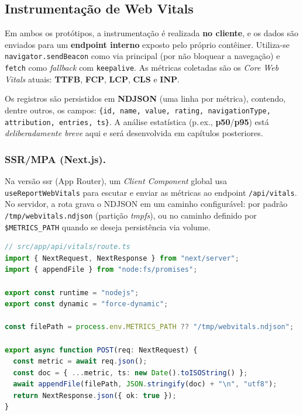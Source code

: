 \subsection{Instrumentação de Web Vitals}
\label{ssec:instrumentacao-webvitals}

Em ambos os protótipos, a instrumentação é realizada \textbf{no cliente}, e os dados são enviados para um \textbf{endpoint interno} exposto pelo próprio contêiner. Utiliza-se \texttt{navigator.sendBeacon} como via principal (por não bloquear a navegação) e \texttt{fetch} como \textit{fallback} com \texttt{keepalive}. As métricas coletadas são os \textit{Core Web Vitals} atuais: \textbf{TTFB}, \textbf{FCP}, \textbf{LCP}, \textbf{CLS} e \textbf{INP}. 

Os registros são persistidos em \textbf{NDJSON} (uma linha por métrica), contendo, dentre outros, os campos:
\texttt{\{id, name, value, rating, navigationType, attribution, entries, ts\}}. A análise estatística (p.\,ex., \textbf{p50}/\textbf{p95}) está \textit{deliberadamente breve} aqui e será desenvolvida em capítulos posteriores.

\subsubsection{SSR/MPA (Next.js).}
Na versão \acrshort{ssr} (App Router), um \textit{Client Component} global usa \texttt{useReportWebVitals} para escutar e enviar as métricas ao endpoint \texttt{/api/vitals}. No servidor, a rota grava o NDJSON em um caminho configurável: por padrão \texttt{/tmp/webvitals.ndjson} (partição \textit{tmpfs}), ou no caminho definido por \texttt{\$METRICS\_PATH} quando se deseja persistência via volume.

\begin{lstlisting}[language=TypeScript,caption={Endpoint de métricas no SSR/Next.js (visão de servidor)}]
// src/app/api/vitals/route.ts
import { NextRequest, NextResponse } from "next/server";
import { appendFile } from "node:fs/promises";

export const runtime = "nodejs";
export const dynamic = "force-dynamic";

const filePath = process.env.METRICS_PATH ?? "/tmp/webvitals.ndjson";

export async function POST(req: NextRequest) {
  const metric = await req.json();
  const doc = { ...metric, ts: new Date().toISOString() };
  await appendFile(filePath, JSON.stringify(doc) + "\n", "utf8");
  return NextResponse.json({ ok: true });
}
\end{lstlisting}

